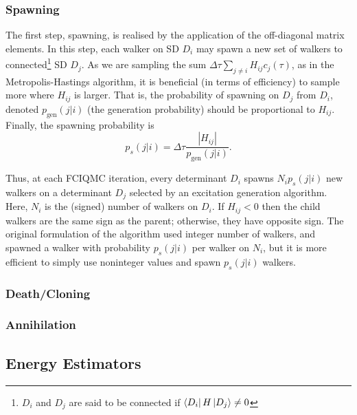 \subsubsection{Spawning}

The first step, spawning, is realised by the application of the off-diagonal matrix elements. In this step, each walker on \gls{SD} $D_i$ may spawn a new set of walkers to connected\footnote{$D_i$ and $D_j$ are said to be connected if $\bra{D_i}H\ket{D_j}\neq 0$} \gls{SD} $D_j$. As we are sampling the sum $\Delta\tau\sum_{j\neq i} H_{ij}c_j(\tau)$, as in the Metropolis-Hastings algorithm, it is beneficial (in terms of efficiency) to sample more where $H_{ij}$ is larger. That is, the probability of spawning on $D_j$ from $D_i$, denoted $p_\mathrm{gen}(j|i)$ (the generation probability) should be proportional to $H_{ij}$. Finally, the spawning probability is
\begin{equation}
    p_s(j|i) = \Delta\tau\frac{|H_{ij}|}{p_\mathrm{gen}(j|i)}.
\end{equation}

Thus, at each FCIQMC iteration, every determinant $D_i$ spawns $N_ip_s(j|i)$ new walkers on a determinant $D_j$ selected by an excitation generation algorithm. Here, $N_i$ is the (signed) number of walkers on $D_i$. If $H_{ij} < 0$ then the child walkers are the same sign as the parent; otherwise, they have opposite sign. The original formulation of the algorithm used integer number of walkers, and spawned a walker with probability $p_s(j|i)$ per walker on $N_i$, but it is more efficient to simply use noninteger values and spawn $p_s(j|i)$ walkers.

\subsubsection{Death/Cloning}

\subsubsection{Annihilation}

\subsection{Energy Estimators}



